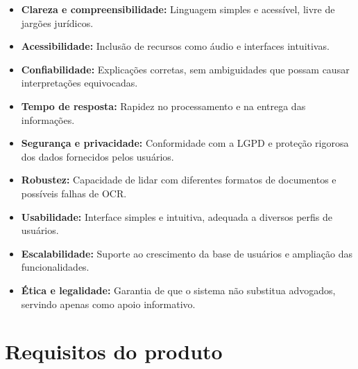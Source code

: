 \documentclass{article}
\begin{document}
\begin{itemize}
    \item \textbf{Clareza e compreensibilidade:} Linguagem simples e acessível, livre de jargões jurídicos.
    \item \textbf{Acessibilidade:} Inclusão de recursos como áudio e interfaces intuitivas.
    \item \textbf{Confiabilidade:} Explicações corretas, sem ambiguidades que possam causar interpretações equivocadas.
    \item \textbf{Tempo de resposta:} Rapidez no processamento e na entrega das informações.
    \item \textbf{Segurança e privacidade:} Conformidade com a LGPD e proteção rigorosa dos dados fornecidos pelos usuários.
    \item \textbf{Robustez:} Capacidade de lidar com diferentes formatos de documentos e possíveis falhas de OCR.
    \item \textbf{Usabilidade:} Interface simples e intuitiva, adequada a diversos perfis de usuários.
    \item \textbf{Escalabilidade:} Suporte ao crescimento da base de usuários e ampliação das funcionalidades.
    \item \textbf{Ética e legalidade:} Garantia de que o sistema não substitua advogados, servindo apenas como apoio informativo.
\end{itemize}

\section{Requisitos do produto}
\end{document}
